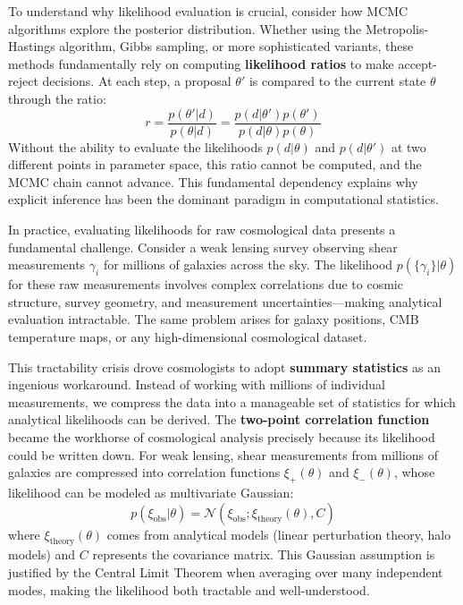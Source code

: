 \documentclass[11pt,a4paper]{article}
\theoremstyle{definition}
\begin{document}
To understand why likelihood evaluation is crucial, consider how MCMC algorithms explore the posterior distribution. Whether using the Metropolis-Hastings algorithm, Gibbs sampling, or more sophisticated variants, these methods fundamentally rely on computing \textbf{likelihood ratios} to make accept-reject decisions. At each step, a proposal $\theta'$ is compared to the current state $\theta$ through the ratio:
\begin{equation}
    r = \frac{p(\theta'|d)}{p(\theta|d)} = \frac{p(d|\theta')p(\theta')}{p(d|\theta)p(\theta)}
\end{equation}
Without the ability to evaluate the likelihoods $p(d|\theta)$ and $p(d|\theta')$ at two different points in parameter space, this ratio cannot be computed, and the MCMC chain cannot advance. This fundamental dependency explains why explicit inference has been the dominant paradigm in computational statistics.

In practice, evaluating likelihoods for raw cosmological data presents a fundamental challenge. Consider a weak lensing survey observing shear measurements $\gamma_{i}$ for millions of galaxies across the sky. The likelihood $p(\{\gamma_i\}|\theta)$ for these raw measurements involves complex correlations due to cosmic structure, survey geometry, and measurement uncertainties—making analytical evaluation intractable. The same problem arises for galaxy positions, CMB temperature maps, or any high-dimensional cosmological dataset.

This tractability crisis drove cosmologists to adopt \textbf{summary statistics} as an ingenious workaround. Instead of working with millions of individual measurements, we compress the data into a manageable set of statistics for which analytical likelihoods can be derived. The \textbf{two-point correlation function} became the workhorse of cosmological analysis precisely because its likelihood could be written down. For weak lensing, shear measurements from millions of galaxies are compressed into correlation functions $\xi_+(\theta)$ and $\xi_-(\theta)$, whose likelihood can be modeled as multivariate Gaussian:
\begin{equation}
    p(\xi_{\text{obs}}|\theta) = \mathcal{N}(\xi_{\text{obs}}; \xi_{\text{theory}}(\theta), C)
\end{equation}
where $\xi_{\text{theory}}(\theta)$ comes from analytical models (linear perturbation theory, halo models) and $C$ represents the covariance matrix. This Gaussian assumption is justified by the Central Limit Theorem when averaging over many independent modes, making the likelihood both tractable and well-understood.
\end{document}
